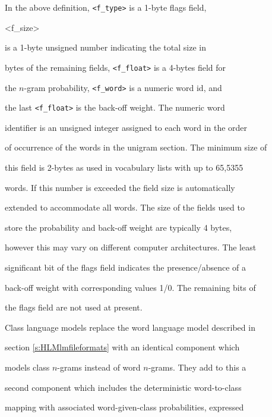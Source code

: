 In the above definition, {\tt <f\_type>} is a 1-byte flags field, {\tt


<f\_size>} is a 1-byte unsigned number indicating the total size in


bytes of the remaining fields, {\tt <f\_float>} is a 4-bytes field for


the $n$-gram probability, {\tt <f\_word>} is a numeric word id, and


the last {\tt <f\_float>} is the back-off weight. The numeric word


identifier is an unsigned integer assigned to each word in the order


of occurrence of the words in the unigram section. The minimum size of


this field is 2-bytes as used in vocabulary lists with up to 65,5355


words. If this number is exceeded the field size is automatically


extended to accommodate all words.  The size of the fields used to


store the probability and back-off weight are typically 4 bytes,


however this may vary on different computer architectures.  The least


significant bit of the flags field indicates the presence/absence of a


back-off weight with corresponding values 1/0. The remaining bits of


the flags field are not used at present.

















Class language models replace the word language model described in


section \ref{s:HLMlmfileformats} with an identical component which


models class $n$-grams instead of word $n$-grams.  They add to this a


second component which includes the deterministic word-to-class


mapping with associated word-given-class probabilities, expressed


